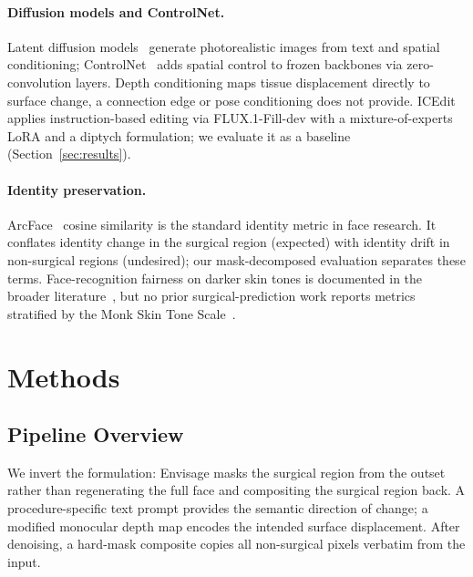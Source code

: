 \documentclass{article}
\newcommand{\method}{Envisage}
\begin{document}
\paragraph{Diffusion models and ControlNet.}
Latent diffusion models~\citep{rombach2022latent} generate photorealistic
images from text and spatial conditioning; ControlNet~\citep{zhang2023controlnet}
adds spatial control to frozen backbones via zero-convolution layers. Depth
conditioning maps tissue displacement directly to surface change, a
connection edge or pose conditioning does not provide.
ICEdit~\citep{zhang2025icedit} applies instruction-based editing via
FLUX.1-Fill-dev with a mixture-of-experts LoRA and a diptych formulation; we
evaluate it as a baseline (Section~\ref{sec:results}).

\paragraph{Identity preservation.}
ArcFace~\citep{deng2019arcface} cosine similarity is the standard identity
metric in face research. It conflates identity change in the surgical
region (expected) with identity drift in non-surgical regions (undesired);
our mask-decomposed evaluation separates these terms. Face-recognition
fairness on darker skin tones is documented in the broader
literature~\citep{buolamwini2018gender}, but no prior surgical-prediction
work reports metrics stratified by the Monk Skin Tone
Scale~\citep{monk2023monk}.

\section{Methods}
\label{sec:methods}

\subsection{Pipeline Overview}

We invert the formulation: \method{} masks the surgical region from the
outset rather than regenerating the full face and compositing the surgical
region back. A procedure-specific text prompt provides the semantic
direction of change; a modified monocular depth map encodes the intended
surface displacement. After denoising, a hard-mask composite copies all
non-surgical pixels verbatim from the input.
\end{document}

